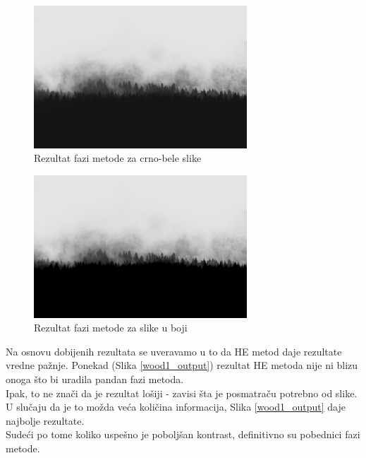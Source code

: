 \documentclass[12pt,a4paper]{article}
\theoremstyle{definition}
\theoremstyle{remark}
\theoremstyle{plain}
\begin{document}
\begin{multicols}{2}
\begin{figure}[H]
\centering
\includegraphics[width=8cm]{images/fuzzy_grayscale_1.jpg}
  \caption{Rezultat fazi metode za crno-bele slike}\label{river1}
\end{figure}
\columnbreak
\begin{figure}[H]
\centering
\includegraphics[width=8cm]{images/fuzzy_color_4.jpg}
  \caption{Rezultat fazi metode za slike u boji}\label{river_output1}
\end{figure}
\end{multicols}

Na osnovu dobijenih rezultata se uveravamo u to da HE metod daje rezultate vredne pa\v znje. Ponekad (Slika \ref{wood1_output}) rezultat HE metoda nije ni blizu onoga
\v sto bi uradila pandan fazi metoda. \\
Ipak, to ne zna\v ci da je rezultat lo\v siji - zavisi \v sta je posmatra\v cu potrebno od slike. U slu\v caju da je to mo\v zda ve\' ca koli\v cina informacija,
Slika \ref{wood1_output} daje najbolje rezultate. \\ 
Sude\' ci po tome koliko uspe\v sno je pobolj\v san kontrast, definitivno su pobednici fazi metode.

\newpage
\end{document}
